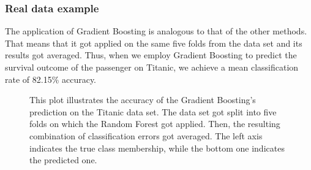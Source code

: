 \subsubsection{Real data example}
The application of Gradient Boosting is analogous to that of the other methods. 
That means that it got applied on the same five folds from the data set and its results got averaged.
Thus, when we employ Gradient Boosting to predict the survival outcome of the passenger on Titanic, 
we achieve a mean classification rate of 82.15\% accuracy.

\begin{figure}[H]
    \captionsetup{format=plain}
    \caption{This plot illustrates the accuracy of the Gradient Boosting's prediction on the Titanic data set.
    The data set got split into five folds on which the Random Forest got applied. 
    Then, the resulting combination of classification errors got averaged.
    The left axis indicates the true class membership, while the bottom one indicates the predicted one.}
    \label{fig:confusion_matrix_gradient_boosting}
\end{figure}

